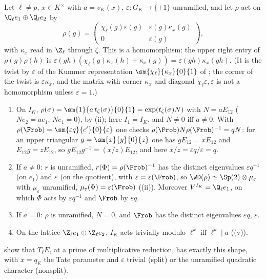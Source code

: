 \begin{example}\label{ex:local:tate-shape-wd}
Let $\ell\ne p$, $x\in K^\times$ with $a=v_K(x)$, $\varepsilon\colon G_K\to\{\pm1\}$ unramified, and let $\rho$ act on $\Q_\ell e_1\oplus\Q_\ell e_2$ by
\[
\rho(g)=\begin{pmatrix}\chi_\ell(g)\varepsilon(g)&\varepsilon(g)\kappa_x(g)\\0&\varepsilon(g)\end{pmatrix},
\]
with $\kappa_x$ read in $\Z_\ell$ through $\zeta$. This is a homomorphism: the upper right entry of $\rho(g)\rho(h)$ is $\varepsilon(gh)(\chi_\ell(g)\kappa_x(h)+\kappa_x(g))=\varepsilon(gh)\kappa_x(gh)$. (It is
the twist by $\varepsilon$ of the Kummer representation $\sm{\chi_\ell}{\kappa_x}{0}{1}$ of ; the corner of the twist is $\varepsilon\kappa_x$, and the matrix with
corner $\kappa_x$ and diagonal $\chi_\ell\varepsilon,\varepsilon$ is not a homomorphism unless $\varepsilon=1$.)
\begin{enumerate}[label=(\roman*)]
\item On $I_K$, $\rho(\sigma)=\sm{1}{a\,t_\zeta(\sigma)}{0}{1}=\exp(t_\zeta(\sigma)N)$ with $N=aE_{12}$ ($Ne_2=ae_1$, $Ne_1=0$), by (ii); here $I_1=I_K$, and
$N\ne0$ iff $a\ne0$. With $\rho(\Frob)=\sm{\varepsilon q}{c'}{0}{\varepsilon}$ one checks $\rho(\Frob)N\rho(\Frob)^{-1}=qN$: for an upper triangular
$g=\sm{x}{y}{0}{z}$ one has $gE_{12}=xE_{12}$ and $E_{12}g=zE_{12}$, so $gE_{12}g^{-1}=(x/z)E_{12}$, and here $x/z=\varepsilon q/\varepsilon=q$.
\item If $a\ne0$: $r$ is unramified, $r(\Phi)=\rho(\Frob)^{-1}$ has the distinct eigenvalues $\varepsilon q^{-1}$ (on $e_1$) and $\varepsilon$ (on the quotient), with $\varepsilon=\varepsilon(\Frob)$, so
$\WD(\rho)\simeq\Sp(2)\otimes\mu_\varepsilon$ with $\mu_\varepsilon$ unramified, $\mu_\varepsilon(\Phi)=\varepsilon(\Frob)$ ((ii)). Moreover $V^{I_K}=\Q_\ell e_1$, on which $\Phi$ acts by
$\varepsilon q^{-1}$ and $\Frob$ by $\varepsilon q$.
\item If $a=0$: $\rho$ is unramified, $N=0$, and $\Frob$ has the distinct eigenvalues $\varepsilon q$, $\varepsilon$.
\item On the lattice $\Z_\ell e_1\oplus\Z_\ell e_2$, $I_K$ acts trivially modulo $\ell^k$ iff $\ell^k\mid a$ ((v)).
\end{enumerate}
 show that $T_\ell E$, at a prime of multiplicative reduction, has exactly this shape, with $x=q_E$ the Tate parameter and
$\varepsilon$ trivial (split) or the unramified quadratic character (nonsplit).
\end{example}

